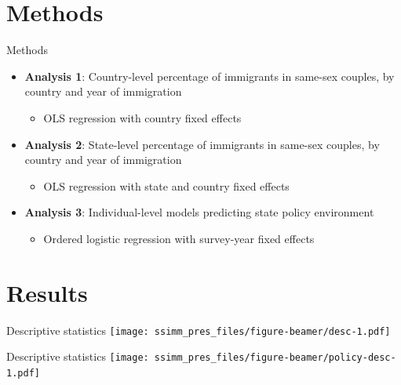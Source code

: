 \documentclass[
  ignorenonframetext,
]{beamer}
\providecommand{\tightlist}{%
  \setlength{\itemsep}{0pt}\setlength{\parskip}{0pt}}
\begin{document}
\hypertarget{methods}{%
\section{Methods}\label{methods}}

\begin{frame}{Methods}
\protect\hypertarget{methods-1}{}
\begin{itemize}
\tightlist
\item
  \textbf{Analysis 1}: Country-level percentage of immigrants in
  same-sex couples, by country and year of immigration

  \begin{itemize}
  \tightlist
  \item
    OLS regression with country fixed effects
  \end{itemize}
\item
  \textbf{Analysis 2}: State-level percentage of immigrants in same-sex
  couples, by country and year of immigration

  \begin{itemize}
  \tightlist
  \item
    OLS regression with state and country fixed effects
  \end{itemize}
\item
  \textbf{Analysis 3}: Individual-level models predicting state policy
  environment

  \begin{itemize}
  \tightlist
  \item
    Ordered logistic regression with survey-year fixed effects
  \end{itemize}
\end{itemize}
\end{frame}

\hypertarget{results}{%
\section{Results}\label{results}}

\begin{frame}{Descriptive statistics}
\protect\hypertarget{descriptive-statistics}{}
\texttt{[image: ssimm\_pres\_files/figure-beamer/desc-1.pdf]}
\end{frame}

\begin{frame}{Descriptive statistics}
\protect\hypertarget{descriptive-statistics-1}{}
\texttt{[image: ssimm\_pres\_files/figure-beamer/policy-desc-1.pdf]}
\end{frame}
\end{document}
